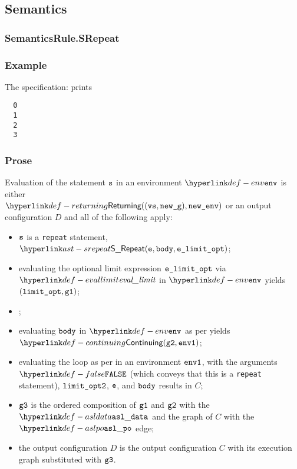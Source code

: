 \subsection{Semantics}
\subsubsection{SemanticsRule.SRepeat \label{sec:SemanticsRule.SRepeat}}
\subsubsection{Example}
The specification:
prints
\begin{Verbatim}
  0
  1
  2
  3
\end{Verbatim}

\subsubsection{Prose}
Evaluation of the statement $\texttt{s}$ in an environment $\env$ is
either \\ $\Returning((\vvs, \newg), \newenv)$ or an output configuration $D$ and all of the following apply:
\begin{itemize}
  \item $\texttt{s}$ is a \texttt{repeat} statement, $\SRepeat(\ve, \vbody, \velimitopt)$;
  \item evaluating the optional limit expression $\texttt{e\_limit\_opt}$ via $\evallimit$ in $\env$
        yields $(\texttt{limit\_opt}, \texttt{g1})$\ProseOrError;
  \item \Proseticklooplimit{$\vlimitoptone$}{$\vlimitopttwo$}\ProseOrError;
  \item evaluating $\texttt{body}$ in $\env$ as per 
        yields $\Continuing(\vgtwo, \envone)$\ProseTerminateAs{\ReturningConfig,\ThrowingConfig,\DynErrorConfig};
  \item evaluating the loop as per  in an environment $\texttt{env1}$,
        with the arguments $\False$ (which conveys that this is a \texttt{repeat} statement),
        $\vlimitopttwo$,
        $\texttt{e}$,
        and $\texttt{body}$
        results in $C$;
  \item $\texttt{g3}$ is the ordered composition of $\texttt{g1}$ and $\texttt{g2}$ with the $\asldata$ and the graph of $C$
        with the $\aslpo$ edge;
  \item the output configuration $D$ is the output configuration $C$ with its execution graph
        substituted with $\texttt{g3}$.
\end{itemize}
